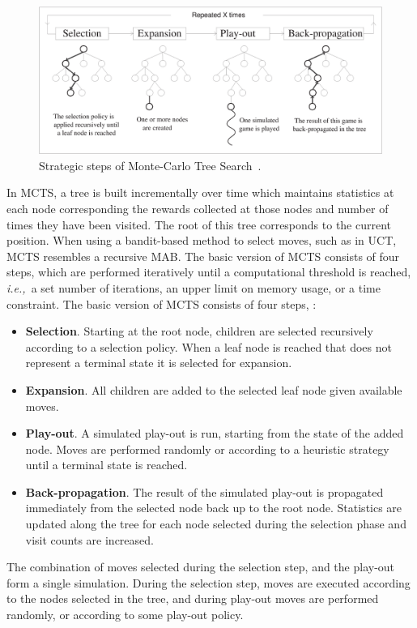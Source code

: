 \documentclass{kecsmstr}
\newcommand{\ie}{{\it i.e.,}~}
\begin{document}
\begin{figure}[ht]
	\centering
	\includegraphics[width=1.\textwidth]{img/figure1.eps}
	\caption{Strategic steps of Monte-Carlo Tree Search~\protect{}.}
	\label{fig:mcts-algorithm}
\end{figure}
\noindent In MCTS, a tree is built incrementally over time which maintains statistics at each node corresponding the rewards collected at those nodes and number of times  they have been visited. The root of this tree corresponds to the current position. When using a bandit-based method to select moves, such as in UCT, MCTS resembles a recursive MAB. The basic version of MCTS consists of four steps, which are performed iteratively until a computational threshold is reached, \ie a set number of iterations, an upper limit on memory usage, or a time constraint. The basic version of MCTS consists of four steps, :
\begin{itemize}
\item {\bf Selection}. Starting at the root node, children are selected recursively according to a selection policy. When a leaf node is reached that does not represent a terminal state it is selected for expansion.
\item {\bf Expansion}. All children are added to the selected leaf node given available moves.
\item {\bf Play-out}. A simulated play-out is run, starting from the state of the added node. Moves are performed randomly or according to a heuristic strategy until a terminal state is reached.
\item {\bf Back-propagation}. The result of the simulated play-out is propagated immediately from the selected node back up to the root node. Statistics are updated along the tree for each node selected during the selection phase and visit counts are increased.
\end{itemize}
The combination of moves selected during the selection step, and the play-out form a single simulation. During the selection step, moves are executed according to the nodes selected in the tree, and during play-out moves are performed randomly, or according to some play-out policy.
\end{document}
